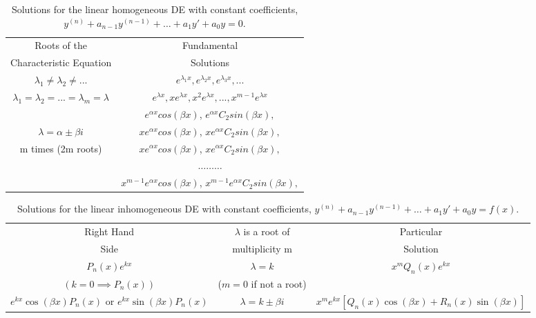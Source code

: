 \documentclass[12pt]{article}
\theoremstyle{definition}
\theoremstyle{remark}
\numberwithin{equation}{section}
\begin{document}
\vspace{1cm}


\bgroup
\def\arraystretch{1.5}
\begin{table}[H]
        \centering
        \caption{Solutions for the linear homogeneous DE with constant coefficients, $y^{(n)}+a_{n-1}y^{(n-1)}+\hdots+a_1y'+a_0y = 0$.}
        \begin{tabular}{c|c}
                Roots of the & Fundamental \\ 
                Characteristic Equation & Solutions \\ \hline
                $\lambda_1 \neq \lambda_2\neq ...$ & $e^{\lambda_1 x},e^{\lambda_2 x},e^{\lambda_3 x},...$ \\
                $\lambda_1 = \lambda_2 =...=\lambda_m= \lambda$ & $e^{\lambda x},xe^{\lambda x},x^2e^{\lambda x},...,x^{m-1}e^{\lambda x}$ \\
                & $e^{\alpha x}cos(\beta x)$, $e^{\alpha x}C_2sin(\beta x),$ \\
                $\lambda = \alpha \pm \beta i$& $xe^{\alpha x}cos(\beta x)$, $xe^{\alpha x}C_2sin(\beta x),$ \\
                m times (2m roots) & $xe^{\alpha x}cos(\beta x)$, $xe^{\alpha x}C_2sin(\beta x),$ \\
                & $\hdots\hdots\hdots$ \\
                & $x^{m-1}e^{\alpha x}cos(\beta x)$, $x^{m-1}e^{\alpha x}C_2sin(\beta x),$
        \end{tabular}
\end{table}
\egroup


\vspace{1cm}


\bgroup
\def\arraystretch{1.5}
\begin{table}[H]
        \centering
        \caption{Solutions for the linear inhomogeneous DE with constant coefficients, $y^{(n)}+a_{n-1}y^{(n-1)}+\hdots+a_1y'+a_0y = f(x)$.}
        \begin{adjustwidth}{-0.7cm}{}
                \begin{tabular}{c|c|c}
                        Right Hand & $\lambda$ is a root of & Particular \\
                        Side & multiplicity m & Solution \\ \hline
                        $P_n(x)e^{kx}$ & $\lambda = k$ & $x^mQ_n(x)e^{kx}$ \\
                        $(k=0 \implies P_n(x))$ & ($m = 0$ if not a root) & \\
                        $e^{kx}\cos(\beta x)P_n(x)$ or $e^{kx}\sin(\beta x)P_n(x)$ & $\lambda = k \pm \beta i$ & $x^me^{kx}[Q_n(x)\cos(\beta x) + R_n(x)\sin(\beta x)]$ \\
                \end{tabular}
        \end{adjustwidth}
\end{table}
\egroup
\end{document}
